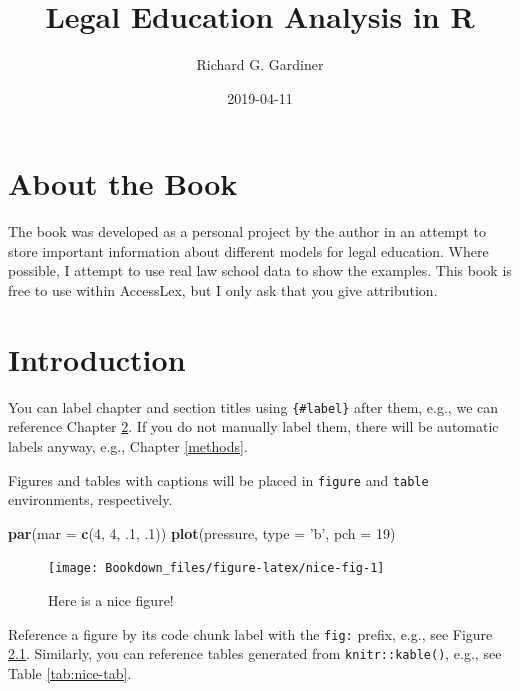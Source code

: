\documentclass[]{book}
\title{Legal Education Analysis in R}
\author{Richard G. Gardiner}
\date{2019-04-11}
\newenvironment{Shaded}{\begin{snugshade}}{\end{snugshade}}
\newcommand{\KeywordTok}[1]{\textcolor[rgb]{0.13,0.29,0.53}{\textbf{#1}}}
\newcommand{\DataTypeTok}[1]{\textcolor[rgb]{0.13,0.29,0.53}{#1}}
\newcommand{\DecValTok}[1]{\textcolor[rgb]{0.00,0.00,0.81}{#1}}
\newcommand{\StringTok}[1]{\textcolor[rgb]{0.31,0.60,0.02}{#1}}
\newcommand{\NormalTok}[1]{#1}
\begin{document}
\maketitle

{
\setcounter{tocdepth}{1}
\tableofcontents
}
\chapter{About the Book}\label{about-the-book}

The book was developed as a personal project by the author in an attempt
to store important information about different models for legal
education. Where possible, I attempt to use real law school data to show
the examples. This book is free to use within AccessLex, but I only ask
that you give attribution.

\chapter{Introduction}\label{intro}

You can label chapter and section titles using \texttt{\{\#label\}}
after them, e.g., we can reference Chapter \ref{intro}. If you do not
manually label them, there will be automatic labels anyway, e.g.,
Chapter \ref{methods}.

Figures and tables with captions will be placed in \texttt{figure} and
\texttt{table} environments, respectively.

\begin{Shaded}
\begin{Highlighting}[]
\KeywordTok{par}\NormalTok{(}\DataTypeTok{mar =} \KeywordTok{c}\NormalTok{(}\DecValTok{4}\NormalTok{, }\DecValTok{4}\NormalTok{, .}\DecValTok{1}\NormalTok{, .}\DecValTok{1}\NormalTok{))}
\KeywordTok{plot}\NormalTok{(pressure, }\DataTypeTok{type =} \StringTok{'b'}\NormalTok{, }\DataTypeTok{pch =} \DecValTok{19}\NormalTok{)}
\end{Highlighting}
\end{Shaded}

\begin{figure}

{\centering \texttt{[image: Bookdown\_files/figure-latex/nice-fig-1]} 

}

\caption{Here is a nice figure!}\label{fig:nice-fig}
\end{figure}

Reference a figure by its code chunk label with the \texttt{fig:}
prefix, e.g., see Figure \ref{fig:nice-fig}. Similarly, you can
reference tables generated from \texttt{knitr::kable()}, e.g., see Table
\ref{tab:nice-tab}.
\end{document}
